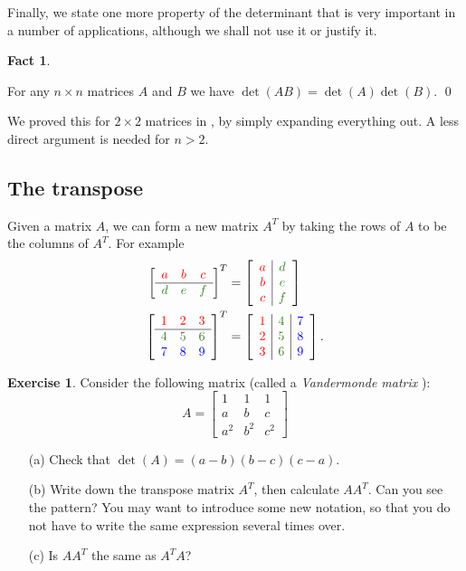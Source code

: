 \documentclass[a4paper]{book}
\newcommand{\RED}[1]{{\color{red}#1}}
\newcommand{\BLUE}[1]{{\color{blue}#1}}
\newcommand{\PURPLE}[1]{{\color{purple}#1}}
\newcommand{\OLIVEGREEN}[1]{{\color{olivegreen}#1}}
\newcommand{\bbm}       {\begin{bmatrix}}
\newcommand{\ebm}       {\end{bmatrix}}
\newcommand{\tm}        {\times}
\renewcommand{\:}{\colon}
\newcommand{\mathworld}[1]{}
\newcommand{\bilabel}[1]{\hypertarget{#1}{\label{#1}}}
\newcommand{\DEFN}[1]{\PURPLE{\emph{#1}}}
\theoremstyle{definition}
\newtheorem{fact}[theorem]{Fact}
\newtheorem{exercise}[theorem]{Exercise}
\begin{document}
Finally, we state one more property of the determinant that is very
important in a number of applications, although we shall not use it or
justify it.
\begin{fact}\bilabel{fact-det-hom}
 For any $n\tm n$ matrices $A$ and $B$ we have
 $\det(AB)=\det(A)\det(B)$. \qed
\end{fact}
We proved this for $2\tm 2$ matrices in , by
simply expanding everything out.  A less direct argument is needed for
$n>2$. 

\subsection{The transpose}
\label{subsec-transpose}

Given a matrix $A$, we can form a new matrix $A^T$ by taking the rows
of $A$ to be the columns of $A^T$.  For example
\begin{align*}
 \left[\begin{array}{ccc}
  \RED{a}&\RED{b}&\RED{c} \\ \hline
  \OLIVEGREEN{d}&\OLIVEGREEN{e}&\OLIVEGREEN{f}
 \end{array}\right]^T &=
 \left[\begin{array}{c|c}
   \RED{a} & \OLIVEGREEN{d} \\
   \RED{b} & \OLIVEGREEN{e} \\
   \RED{c} & \OLIVEGREEN{f}
 \end{array}\right] \\
 \left[\begin{array}{ccc}
  \RED{1}&\RED{2}&\RED{3} \\ \hline
  \OLIVEGREEN{4}&\OLIVEGREEN{5}&\OLIVEGREEN{6} \\
  \BLUE{7} & \BLUE{8} & \BLUE{9} 
 \end{array}\right]^T &=
 \left[\begin{array}{c|c|c}
   \RED{1} & \OLIVEGREEN{4} & \BLUE{7} \\
   \RED{2} & \OLIVEGREEN{5} & \BLUE{8} \\
   \RED{3} & \OLIVEGREEN{6} & \BLUE{9}
 \end{array}\right]. \\
\end{align*}
\begin{exercise}
 Consider the following matrix (called a \DEFN{Vandermonde matrix}
 \mathworld{VandermondeMatrix}):
 \[ A = \bbm
          1   & 1   & 1   \\
          a   & b   & c   \\
          a^2 & b^2 & c^2
        \ebm
 \]
 \begin{itemize}
  \item[(a)] Check that $\det(A)=(a-b)(b-c)(c-a)$.
  \item[(b)]
   Write down the transpose matrix $A^T$, then calculate $AA^T$.  Can
   you see the pattern?  You may want to introduce some new
   notation, so that you do not have to write the same expression
   several times over.
  \item[(c)] Is $AA^T$ the same as $A^TA$?
 \end{itemize}
\end{exercise}
\end{document}
